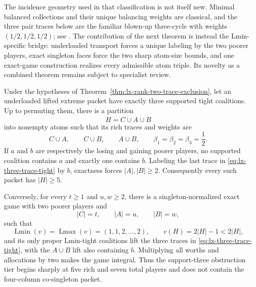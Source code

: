 The incidence geometry used in that classification is not itself new.
Minimal balanced collections and their unique balancing weights are
classical, and the three pair traces below are the familiar blown-up
three-cycle with weights $(1/2,1/2,1/2)$; see
\citet{LohmannBormHerings2012,LaplaceMermoudEtAl2025}.  The contribution of
the next theorem is instead the Lmin-specific bridge: underloaded transport
forces a unique labeling by the two poorer players, exact singleton faces
force the two sharp atom-size bounds, and one exact-game construction
realizes every admissible atom triple.  Its novelty as a combined theorem
remains subject to specialist review.

\begin{theorem}
\label{thm:lx-three-trace-obstruction}
Under the hypotheses of
Theorem~\ref{thm:lx-rank-two-trace-exclusion}, let an underloaded lifted
extreme packet have exactly three supported tight coalitions.  Up to
permuting them, there is a partition
\[
 H=C\mathbin{\dot\cup}A\mathbin{\dot\cup}B
\]
into nonempty atoms such that its rich traces and weights are
\[
 C\cup A,\qquad C\cup B,\qquad A\cup B,
 \qquad \beta_1=\beta_2=\beta_3=\frac12.           \tag{HT}
 \label{eq:lx-three-trace-tight}
\]
If $a$ and $b$ are respectively the losing and gaining poorer players, no
supported coalition contains $a$ and exactly one contains $b$.  Labeling the
last trace in \eqref{eq:lx-three-trace-tight} by $b$, exactness forces
$|A|,|B|\geq2$.  Consequently every such packet has $|H|\geq5$.

Conversely, for every $t\geq1$ and $u,w\geq2$, there is a
singleton-normalized exact game with two poorer players and
\[
 |C|=t,\qquad |A|=u,\qquad |B|=w,
\]
such that
\[
 \operatorname{Lmin}(v)=\operatorname{Lmax}(v)
 =(1,1,2,\ldots,2),
 \qquad v(H)=2|H|-1<2|H|,
\]
and its only proper Lmin-tight coalitions lift the three traces in
\eqref{eq:lx-three-trace-tight}, with the $A\cup B$ lift also containing
$b$.  Multiplying all worths and allocations by two makes the game integral.
Thus the support-three obstruction tier begins sharply at five rich and
seven total players and does not contain the four-column co-singleton packet.
\end{theorem}

